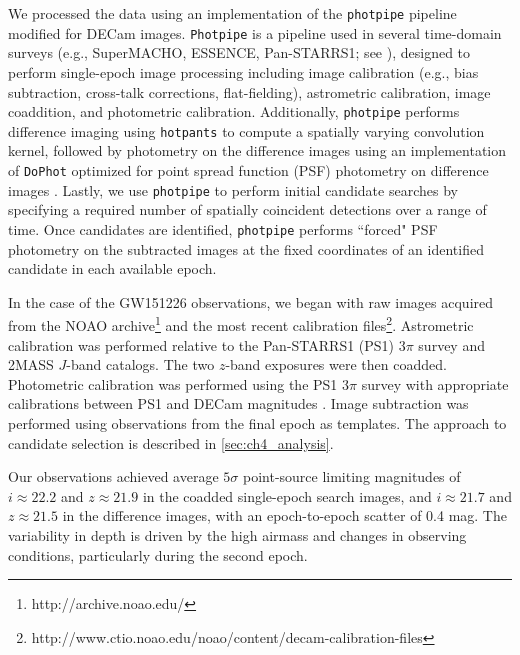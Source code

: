 We processed the data using an implementation of the {\tt photpipe}  pipeline modified for DECam images. {\tt Photpipe} is a pipeline used in several time-domain surveys (e.g., SuperMACHO, ESSENCE, Pan-STARRS1; see \citealt{Rest+05,Garg+07,Miknaitis+07,Rest+14}), designed to perform single-epoch image processing including image calibration (e.g., bias subtraction, cross-talk corrections, flat-fielding), astrometric calibration, image coaddition, and photometric calibration. Additionally, {\tt photpipe} performs difference imaging using {\tt hotpants} \citep{Alard2000,Becker2015} to compute a spatially varying convolution kernel, followed by photometry on the difference images using an implementation of {\tt DoPhot} optimized for point spread function (PSF) photometry on difference images \citep{Schechter+93}. Lastly, we use {\tt photpipe} to perform initial candidate searches by specifying a required number of spatially coincident detections over a range of time. Once candidates are identified, {\tt photpipe} performs ``forced" PSF photometry on the subtracted images at the fixed coordinates of an identified candidate in each available epoch.

\clearpage
In the case of the GW151226 observations, we began with raw images acquired from the NOAO archive\footnote{\singlespace http://archive.noao.edu/} and the most recent calibration files\footnote{\singlespace http://www.ctio.noao.edu/noao/content/decam-calibration-files}. Astrometric calibration was performed relative to the Pan-STARRS1 (PS1) $3\pi$ survey and 2MASS $J$-band catalogs. The two $z$-band exposures were then coadded. Photometric calibration was performed using the PS1 $3\pi$ survey with appropriate calibrations between  PS1 and DECam magnitudes \citep{Scolnic+15}. Image subtraction was performed using observations from the final epoch as templates. The approach to candidate selection is described in \cref{sec:ch4_analysis}.

Our observations achieved average $5\sigma$ point-source limiting magnitudes of $i\approx22.2$ and $z\approx21.9$ in the coadded single-epoch search images, and $i\approx21.7$ and $z\approx21.5$ in the difference images, with an epoch-to-epoch scatter of 0.4 mag. The variability in  depth is driven by the high airmass and changes in observing conditions, particularly during the second epoch.

